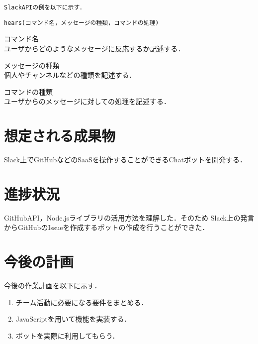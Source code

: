 \documentclass[uplatex,twocolumn,dvipdfmx]{jsarticle}
\begin{document}
\begin{verbatim}
SlackAPIの例を以下に示す．
\end{verbatim}

\begin{small}
\begin{verbatim}
hears(コマンド名，メッセージの種類，コマンドの処理)
\end{verbatim}
\end{small}

\begin{description}
\begin{small}
\item[コマンド名]\mbox{}\\ 
ユーザからどのようなメッセージに反応するか記述する．
\item[メッセージの種類]\mbox{}\\ 
個人やチャンネルなどの種類を記述する．
\item[コマンドの種類]\mbox{}\\ 
ユーザからのメッセージに対しての処理を記述する．
\end{small}

\end{description}




\section{想定される成果物}
Slack上でGitHubなどのSaaSを操作することができるChatボットを開発する．

\section{進捗状況}
GitHubAPI，Node.jsライブラリの活用方法を理解した．そのため
Slack上の発言からGitHubのIssueを作成するボットの作成を行うことができた．




\section{今後の計画}
今後の作業計画を以下に示す．
\begin{enumerate}
\item チーム活動に必要になる要件をまとめる．
\item JavaScriptを用いて機能を実装する．
\item ボットを実際に利用してもらう．
\end{enumerate}




\end{document}
